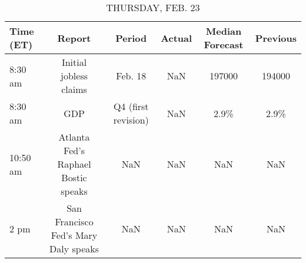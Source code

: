 \documentclass{article}%
\begin{document}
%


\begin{table}[htbp]%
\caption{THURSDAY, FEB. 23}%
\centering%
\begin{adjustbox}{width=1\textwidth}%
\begin{tabular}{lccccc}
\toprule
Time (ET) &                               Report &              Period & Actual & Median Forecast & Previous \\
\midrule
  8:30 am &               Initial jobless claims &             Feb. 18 &    NaN &          197000 &   194000 \\
  8:30 am &                                  GDP & Q4 (first revision) &    NaN &            2.9\% &     2.9\% \\
 10:50 am &  Atlanta Fed's Raphael Bostic speaks &                 NaN &    NaN &             NaN &      NaN \\
     2 pm & San Francisco Fed's Mary Daly speaks &                 NaN &    NaN &             NaN &      NaN \\
\bottomrule
\end{tabular}
%
\end{adjustbox}%
\end{table}

%
\end{document}
